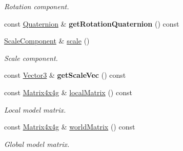 \begin{Indent}
\begin{DoxyCompactItemize}
\begin{DoxyCompactList}\small\item\em Rotation component. \end{DoxyCompactList}\item 
\mbox{\label{classrev_1_1_transform_abb78789e3b77cd99e29e6db9ffcbcd6c}} 
const \mbox{\hyperlink{classrev_1_1_quaternion}{Quaternion}} \& {\bfseries get\+Rotation\+Quaternion} () const
\item 
\mbox{\label{classrev_1_1_transform_ae79acfc2983211eb4c1208f825256d7a}} 
\mbox{\hyperlink{classrev_1_1_scale_component}{Scale\+Component}} \& \mbox{\hyperlink{classrev_1_1_transform_ae79acfc2983211eb4c1208f825256d7a}{scale}} ()
\begin{DoxyCompactList}\small\item\em Scale component. \end{DoxyCompactList}\item 
\mbox{\label{classrev_1_1_transform_a7807bec1562a9634b4ddf0bbd013fea2}} 
const \mbox{\hyperlink{classrev_1_1_vector}{Vector3}} \& {\bfseries get\+Scale\+Vec} () const
\item 
\mbox{\label{classrev_1_1_transform_a3ff4acf39a7481c0c1f3c0318738013f}} 
const \mbox{\hyperlink{classrev_1_1_square_matrix}{Matrix4x4g}} \& \mbox{\hyperlink{classrev_1_1_transform_a3ff4acf39a7481c0c1f3c0318738013f}{local\+Matrix}} () const
\begin{DoxyCompactList}\small\item\em Local model matrix. \end{DoxyCompactList}\item 
\mbox{\label{classrev_1_1_transform_ae8c44d028e61c1151bc61fa4b25b458f}} 
const \mbox{\hyperlink{classrev_1_1_square_matrix}{Matrix4x4g}} \& \mbox{\hyperlink{classrev_1_1_transform_ae8c44d028e61c1151bc61fa4b25b458f}{world\+Matrix}} () const
\begin{DoxyCompactList}\small\item\em Global model matrix. \end{DoxyCompactList}\item 
\mbox{\label{classrev_1_1_transform_a6ee4c67ad1b8e16e56545abfab21dd59}} 

\end{DoxyCompactItemize}
\end{Indent}
